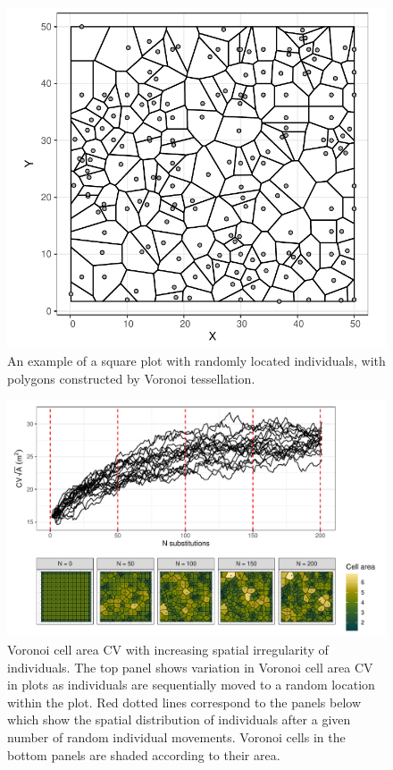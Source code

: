 \begin{refsection}
\begin{figure}
\centering
	\includegraphics[width=0.6\linewidth]{img/voronoi_example}
	\caption[Example of Voronoi tessellation of trees with a plot]{An example of a square plot with \wiki{} randomly located individuals, with polygons constructed by Voronoi tessellation.}
	\label{workflow:voronoi_example}
\end{figure}

\begin{figure}
\centering
	\includegraphics[width=\linewidth]{img/voronoi_diag}
	\caption[Behaviour of Voronoi cell area CV with increasing spatial irregularity of individuals]{Voronoi cell area CV with increasing spatial irregularity of individuals. The top panel shows variation in Voronoi cell area CV in \wireps{} plots as individuals are sequentially moved to a random location within the plot. Red dotted lines correspond to the panels below which show the spatial distribution of individuals after a given number of random individual movements. Voronoi cells in the bottom panels are shaded according to their area.}
	\label{workflow:voronoi_diag}
\end{figure}


\end{refsection}
